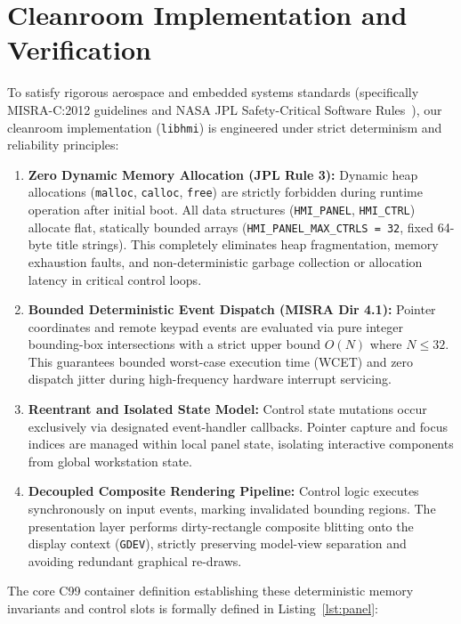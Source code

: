 \documentclass[10pt,journal,compsoc,twocolumn]{article}
\begin{document}
\section{Cleanroom Implementation and Verification}
\label{sec:impl}

To satisfy rigorous aerospace and embedded systems standards (specifically MISRA-C:2012 guidelines and NASA JPL Safety-Critical Software Rules~\cite{holzmann2006jpl}), our cleanroom implementation (\texttt{libhmi}) is engineered under strict determinism and reliability principles:

\begin{enumerate}[leftmargin=*]
    \item \textbf{Zero Dynamic Memory Allocation (JPL Rule 3):} Dynamic heap allocations (\texttt{malloc}, \texttt{calloc}, \texttt{free}) are strictly forbidden during runtime operation after initial boot. All data structures (\texttt{HMI\_PANEL}, \texttt{HMI\_CTRL}) allocate flat, statically bounded arrays (\texttt{HMI\_PANEL\_MAX\_CTRLS = 32}, fixed 64-byte title strings). This completely eliminates heap fragmentation, memory exhaustion faults, and non-deterministic garbage collection or allocation latency in critical control loops.
    \item \textbf{Bounded Deterministic Event Dispatch (MISRA Dir 4.1):} Pointer coordinates and remote keypad events are evaluated via pure integer bounding-box intersections with a strict upper bound $O(N)$ where $N \le 32$. This guarantees bounded worst-case execution time (WCET) and zero dispatch jitter during high-frequency hardware interrupt servicing.
    \item \textbf{Reentrant and Isolated State Model:} Control state mutations occur exclusively via designated event-handler callbacks. Pointer capture and focus indices are managed within local panel state, isolating interactive components from global workstation state.
    \item \textbf{Decoupled Composite Rendering Pipeline:} Control logic executes synchronously on input events, marking invalidated bounding regions. The presentation layer performs dirty-rectangle composite blitting onto the display context (\texttt{GDEV}), strictly preserving model-view separation and avoiding redundant graphical re-draws.
\end{enumerate}

The core C99 container definition establishing these deterministic memory invariants and control slots is formally defined in Listing~\ref{lst:panel}:
\end{document}
